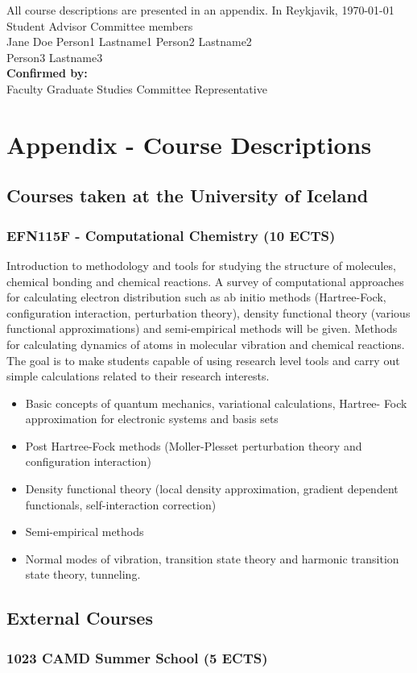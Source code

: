 \documentclass[a4paper,english]{article}
\begin{document}
\noindent All course descriptions are presented in an appendix.
\newpage
\noindent In Reykjavik, \today\\[3cm]
\noindent Student \hspace*{\fill} Advisor \hspace*{\fill} Committee members\\
\noindent Jane Doe \hspace*{\fill} Person1 Lastname1 \hspace*{\fill} Person2 Lastname2\\
\hspace*{\fill} Person3 Lastname3\\[1cm]
\noindent \textbf{Confirmed by:}\\[3cm]
Faculty Graduate Studies Committee Representative

\newpage
\section*{Appendix - Course Descriptions}
\subsection*{Courses taken at the University of Iceland}
\subsubsection*{EFN115F - Computational Chemistry (10 ECTS)}
Introduction to methodology and tools for studying the structure of molecules, chemical bonding and chemical reactions. A survey of computational approaches for calculating electron distribution such as ab initio methods (Hartree-Fock, configuration interaction, perturbation theory), density functional theory (various functional approximations) and semi-empirical methods will be given. Methods for calculating dynamics of atoms in molecular vibration and chemical reactions. The goal is to make students capable of using research level tools and carry out simple calculations related to their research interests.
\begin{itemize}
        \item Basic concepts of quantum mechanics, variational calculations, Hartree- Fock approximation for electronic systems and basis sets
        \item Post Hartree-Fock methods (Moller-Plesset perturbation theory and configuration interaction) 
        \item Density functional theory (local density approximation, gradient dependent functionals, self-interaction correction)
        \item Semi-empirical methods
        \item Normal modes of vibration, transition state theory and harmonic transition state theory, tunneling.
\end{itemize}

\subsection*{External Courses}
\subsubsection*{1023 CAMD Summer School (5 ECTS)}
\lipsum[77]{}
\lipsum[28]{}
\end{document}
